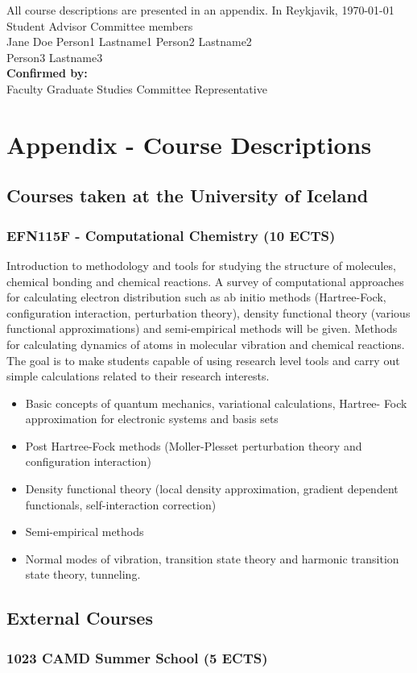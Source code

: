 \documentclass[a4paper,english]{article}
\begin{document}
\noindent All course descriptions are presented in an appendix.
\newpage
\noindent In Reykjavik, \today\\[3cm]
\noindent Student \hspace*{\fill} Advisor \hspace*{\fill} Committee members\\
\noindent Jane Doe \hspace*{\fill} Person1 Lastname1 \hspace*{\fill} Person2 Lastname2\\
\hspace*{\fill} Person3 Lastname3\\[1cm]
\noindent \textbf{Confirmed by:}\\[3cm]
Faculty Graduate Studies Committee Representative

\newpage
\section*{Appendix - Course Descriptions}
\subsection*{Courses taken at the University of Iceland}
\subsubsection*{EFN115F - Computational Chemistry (10 ECTS)}
Introduction to methodology and tools for studying the structure of molecules, chemical bonding and chemical reactions. A survey of computational approaches for calculating electron distribution such as ab initio methods (Hartree-Fock, configuration interaction, perturbation theory), density functional theory (various functional approximations) and semi-empirical methods will be given. Methods for calculating dynamics of atoms in molecular vibration and chemical reactions. The goal is to make students capable of using research level tools and carry out simple calculations related to their research interests.
\begin{itemize}
        \item Basic concepts of quantum mechanics, variational calculations, Hartree- Fock approximation for electronic systems and basis sets
        \item Post Hartree-Fock methods (Moller-Plesset perturbation theory and configuration interaction) 
        \item Density functional theory (local density approximation, gradient dependent functionals, self-interaction correction)
        \item Semi-empirical methods
        \item Normal modes of vibration, transition state theory and harmonic transition state theory, tunneling.
\end{itemize}

\subsection*{External Courses}
\subsubsection*{1023 CAMD Summer School (5 ECTS)}
\lipsum[77]{}
\lipsum[28]{}
\end{document}
